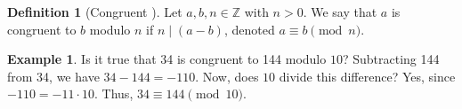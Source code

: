 \documentclass[12pt, titlepage]{amsart}
\newcommand\Z{{\mathbb Z}}
\newtheorem{lemma}{Lemma}[subsection]
\newtheorem{prop}{Proposition}[subsection]
\theoremstyle{definition}
\newtheorem{definition}{Definition}[subsection]
\newtheorem{example}{Example}[subsection]
\begin{document}
%	
%	
	
	\begin{definition}[Congruent \cite{pommersheim}]\label{definition:congruent}
		Let $a,b,n \in \Z$ with $n > 0$. We say that $a$ is congruent to $b$ modulo $n$ if $n \mid (a - b)$, denoted $a \equiv b \pmod n$. 
	\end{definition}

	\begin{example}\label{example:congruent}
		Is it true that 34 is congruent to 144 modulo $10$? Subtracting 144 from 34, we have $34 - 144 = -110$. Now, does $10$ divide this difference? Yes, since $-110 = -11 \cdot 10$. Thus, $34 \equiv 144 \pmod{10}$.
	\end{example}
	
%	
%	
	
\end{document}
